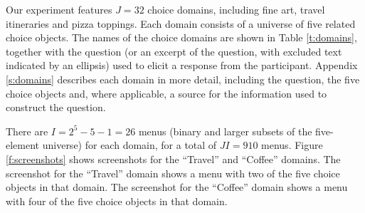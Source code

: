 \documentclass[11pt,letter]{article}
\newcommand{\menus}{menus}
\begin{document}
Our experiment features $J=32$ choice domains, including fine art, travel itineraries and pizza toppings.
Each domain consists of a universe of five related choice objects.
The names of the choice domains are shown in Table \ref{t:domains}, together with the question (or an excerpt of the question, with excluded text indicated by an ellipsis) used to elicit a response from the participant.
Appendix \ref{s:domains} describes each domain in more detail, including the question, the five choice objects and, where applicable, a source for the information used to construct the question.

There are $I=2^{5}-5-1=26$ \menus{} (binary and larger subsets of the five-element universe) for each domain, for a total of $JI=910$ \menus{}.
Figure \ref{f:screenshots} shows screenshots for the ``Travel'' and ``Coffee'' domains.
The screenshot for the ``Travel'' domain shows a menu with two of the five choice objects in that domain.
The screenshot for the ``Coffee'' domain shows a menu with four of the five choice objects in that domain.
\end{document}
